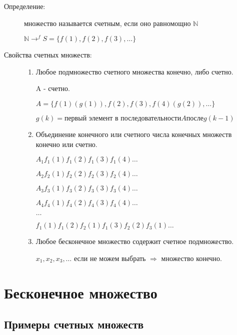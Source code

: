 \documentclass[12pt]{article}
\begin{document}
\begin{description}
\item[Определение:] множество называется счетным, если оно равномощно $\mathbb N$

$\mathbb N \to^{f} S = \{f(1), f(2), f(3), \ldots \}$

\item[Свойства счетных множеств:]

\begin{enumerate}
\item Любое подмножество счетного множества конечно, либо счетно. 

A - счетно.

$A =\{f(1)(g(1)), f(2), f(3), f(4)(g(2)), \ldots \}$

$g(k) = \text{первый элемент в последовательности} A \text{после} g(k - 1)$

\item Объединение конечного или счетного числа конечных множеств конечно или счетно.

$A_1 f_1(1) f_1(2) f_1(3) f_1(4) \ldots$

$A_2 f_2(1) f_2(2) f_2(3) f_2(4) \ldots$

$A_3 f_3(1) f_3(2) f_3(3) f_3(4) \ldots$

$A_4 f_4(1) f_4(2) f_4(3) f_4(4) \ldots$

$\ldots$

$f_1(1) f_1(2) f_2(1) f_1(3) f_2(2) f_3(1) \ldots$

\item Любое бесконечное множество содержит счетное подмножество. 

$x_1, x_2, x_3, \ldots$  если не можем выбрать $\Rightarrow$ множество конечно.
\end{enumerate}

\end{description}

\section{Бесконечное множество}

\subsection{Примеры счетных множеств}
\end{document}
